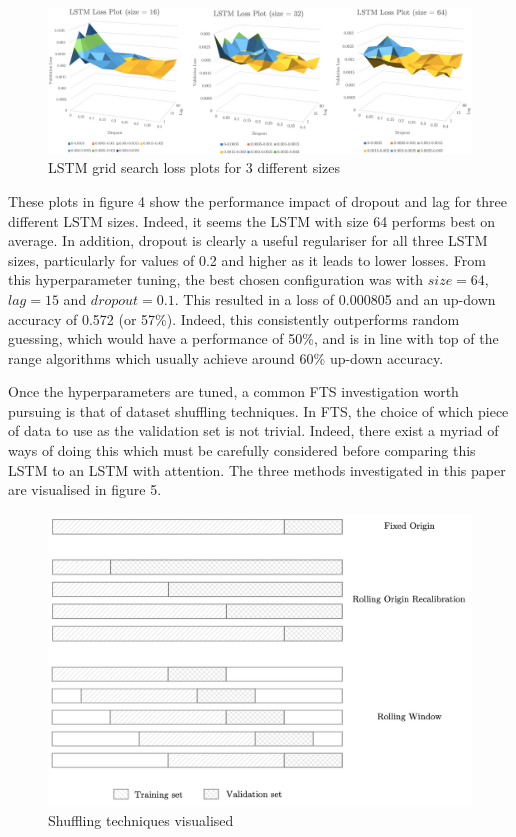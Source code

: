\documentclass{article}
\begin{document}
\begin{figure}[!h]
	\includegraphics[width=395pt]{LSTMgrid.png}
	\caption{LSTM grid search loss plots for 3 different sizes}
\end{figure}

These plots in figure 4 show the performance impact of dropout and lag for three different LSTM sizes. Indeed, it seems the LSTM with size 64 performs best on average. In addition, dropout is clearly a useful regulariser for all three LSTM sizes, particularly for values of 0.2 and higher as it leads to lower losses. From this hyperparameter tuning, the best chosen configuration was with $size=64$, $lag=15$ and $dropout=0.1$. This resulted in a loss of 0.000805 and an up-down accuracy of 0.572 (or 57\%). Indeed, this consistently outperforms random guessing, which would have a performance of 50\%, and is in line with top of the range algorithms which usually achieve around 60\% up-down accuracy. 

Once the hyperparameters are tuned, a common FTS investigation worth pursuing is that of dataset shuffling techniques. In FTS, the choice of which piece of data to use as the validation set is not trivial. Indeed, there exist a myriad of ways of doing this which must be carefully considered before comparing this LSTM to an LSTM with attention. The three methods investigated in this paper are visualised in figure 5. 

\begin{figure}[!h]
	\begin{center}
    \includegraphics[width=395pt]{Shuffling.png}
	\end{center}
	\caption{Shuffling techniques visualised}
\end{figure}
\end{document}
